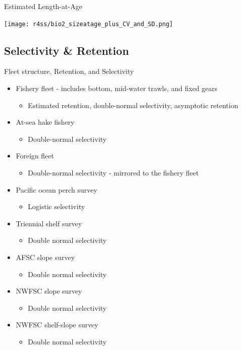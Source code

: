 \documentclass[pdf]{beamer}\usepackage[]{graphicx}\usepackage[]{color}
\begin{document}
\begin{frame}{Estimated Length-at-Age}
  \begin{center}
    \texttt{[image: r4ss/bio2\_sizeatage\_plus\_CV\_and\_SD.png]}
  \end{center}
\end{frame}


\subsection{Selectivity \& Retention}  
\begin{frame}{Fleet structure, Retention, and Selectivity}
  \begin{itemize}
    \item Fishery fleet - includes bottom, mid-water trawls, and fixed gears
      \begin{itemize}
        \item Estimated retention, double-normal selectivity, asymptotic retention
      \end{itemize}
    \item At-sea hake fishery
      \begin{itemize}
        \item Double-normal selectivity
      \end{itemize}
    \item Foreign fleet
      \begin{itemize}
        \item Double-normal selectivity - mirrored to the fishery fleet
      \end{itemize}
    \item Pacific ocean perch survey
      \begin{itemize}
        \item Logistic selectivity 
      \end{itemize}
    \item Triennial shelf survey
      \begin{itemize}
        \item Double normal selectivity 
      \end{itemize}
    \item AFSC slope survey
        \begin{itemize}
        \item Double normal selectivity 
      \end{itemize}
    \item NWFSC slope survey
      \begin{itemize}
        \item Double normal selectivity 
      \end{itemize}
    \item NWFSC shelf-slope survey
      \begin{itemize}
        \item Double normal selectivity 
      \end{itemize}
  \end{itemize}
\end{frame}
\end{document}
